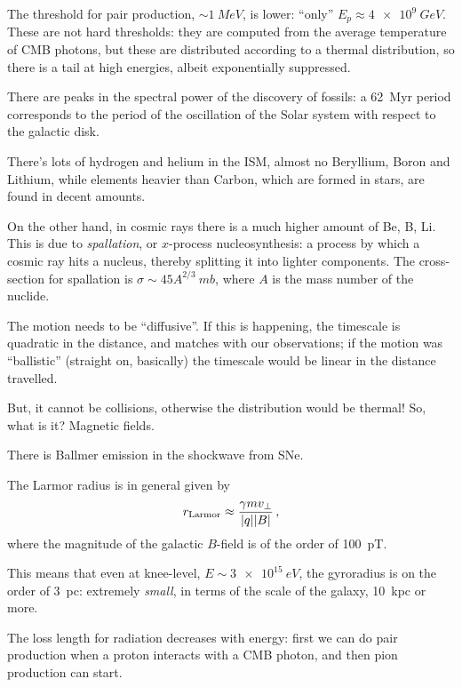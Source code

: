 \documentclass[main.tex]{subfiles}
\begin{document}
The threshold for pair production, \(\sim \SI{1}{MeV}\), is lower: ``only'' \(E_p \approx \SI{4e9}{GeV}\). 
These are not hard thresholds: they are computed from the 
average temperature of CMB photons, but these are distributed according to a thermal distribution, so there is a tail at high energies, albeit exponentially suppressed. 

There are peaks in the spectral power of the discovery of fossils: 
a \SI{62}{Myr} period corresponds to the period of the oscillation of the Solar system 
with respect to the galactic disk. 


There's lots of hydrogen and helium in the ISM, 
almost no Beryllium, Boron and Lithium, 
while elements heavier than Carbon, which are formed in stars, are found in decent amounts.

On the other hand, in cosmic rays there is a much higher amount of Be, B, Li.
This is due to \emph{spallation}, or \(x\)-process nucleosynthesis: a process by which a cosmic ray hits a nucleus, thereby splitting it into lighter components. 
The cross-section for spallation is \(\sigma \sim 45 A^{2/3} \SI{}{mb}\), where \(A\) is the mass number of the nuclide. 

The motion needs to be ``diffusive''.
If this is happening, the timescale is quadratic in the distance, and matches with our observations; if the motion
was ``ballistic'' (straight on, basically) the timescale would be linear in the distance travelled.

But, it cannot be collisions, otherwise the distribution would be thermal! So, what is it?
Magnetic fields. 

There is Ballmer emission in the shockwave from SNe. 

The Larmor radius is in general given by 
%
\begin{align}
r _{\text{Larmor}} \approx \frac{\gamma m v_\perp}{\abs{q} \abs{B}}
\,,
\end{align}
%
where the magnitude of the galactic \(B\)-field is of the order of \SI{100}{pT}.


This means that even at knee-level, \(E \sim \SI{3e15}{eV}\), the gyroradius is on the order of \SI{3}{pc}: extremely \emph{small}, in terms of the scale of the galaxy, \SI{10}{kpc} or more.

The loss length for radiation decreases with energy: first we can do pair production when
a proton interacts with a CMB photon, and then pion production can start. 
\end{document}
